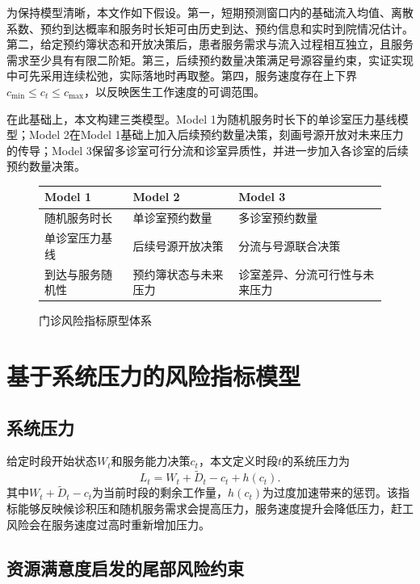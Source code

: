 \documentclass[a4paper,zihao=-4]{ctexart}
\numberwithin{figure}{section}
\numberwithin{table}{section}
\begin{document}
为保持模型清晰，本文作如下假设。第一，短期预测窗口内的基础流入均值、离散系数、预约到达概率和服务时长矩可由历史到达、预约信息和实时到院情况估计。第二，给定预约簿状态和开放决策后，患者服务需求与流入过程相互独立，且服务需求至少具有有限二阶矩。第三，后续预约数量决策满足号源容量约束，实证实现中可先采用连续松弛，实际落地时再取整。第四，服务速度存在上下界$c_{\min}\leq c_t\leq c_{\max}$，以反映医生工作速度的可调范围。

在此基础上，本文构建三类模型。Model 1为随机服务时长下的单诊室压力基线模型；Model 2在Model 1基础上加入后续预约数量决策，刻画号源开放对未来压力的传导；Model 3保留多诊室可行分流和诊室异质性，并进一步加入各诊室的后续预约数量决策。

\begin{figure}[H]
  \centering
  \begin{tabular}{>{\centering\arraybackslash}p{}>{\centering\arraybackslash}p{}>{\centering\arraybackslash}p{}}
  \toprule
  Model 1 & Model 2 & Model 3 \\
  \midrule
  随机服务时长 & 单诊室预约数量 & 多诊室预约数量 \\
  单诊室压力基线 & 后续号源开放决策 & 分流与号源联合决策 \\
  到达与服务随机性 & 预约簿状态与未来压力 & 诊室差异、分流可行性与未来压力 \\
  \bottomrule
  \end{tabular}
  \caption{门诊风险指标原型体系}
  \label{fig:model-framework}
\end{figure}

\section{基于系统压力的风险指标模型}

\subsection{系统压力}

给定时段开始状态$W_t$和服务能力决策$c_t$，本文定义时段$t$的系统压力为
\begin{equation}
L_t=W_t+\tilde D_t-c_t+h(c_t).
\label{eq:general-pressure}
\end{equation}
其中$W_t+\tilde D_t-c_t$为当前时段的剩余工作量，$h(c_t)$为过度加速带来的惩罚。该指标能够反映候诊积压和随机服务需求会提高压力，服务速度提升会降低压力，赶工风险会在服务速度过高时重新增加压力。

\subsection{资源满意度启发的尾部风险约束}
\end{document}
